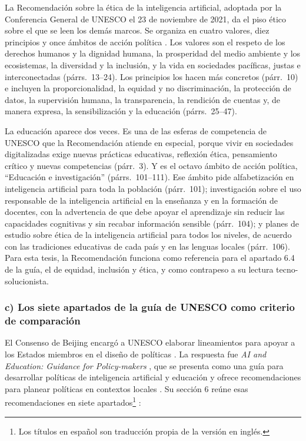 La Recomendación sobre la ética de la inteligencia artificial, adoptada por la Conferencia
General de UNESCO el 23 de noviembre de 2021, da el piso ético sobre el que se leen los
demás marcos. Se organiza en cuatro
valores, diez principios y once ámbitos de acción política \citep{unesco2021ai}. Los
valores son el respeto de los derechos humanos y la dignidad humana, la prosperidad del
medio ambiente y los ecosistemas, la diversidad y la inclusión, y la vida en sociedades
pacíficas, justas e interconectadas (párrs.~13--24). Los principios los hacen más
concretos (párr.~10) e incluyen la proporcionalidad, la equidad y no discriminación, la
protección de datos, la supervisión humana, la transparencia, la rendición de cuentas y,
de manera expresa, la sensibilización y la educación (párrs.~25--47).

La educación aparece dos veces. Es una de las esferas de competencia de UNESCO que la
Recomendación atiende en especial, porque vivir en sociedades digitalizadas exige nuevas
prácticas educativas, reflexión ética, pensamiento crítico y nuevas competencias
(párr.~3). Y es el octavo ámbito de acción política, ``Educación e investigación''
(párrs.~101--111). Ese ámbito pide alfabetización en inteligencia artificial para toda la
población (párr.~101); investigación sobre el uso responsable de la inteligencia artificial
en la enseñanza y en la formación de docentes, con la advertencia de que debe apoyar el
aprendizaje sin reducir las capacidades cognitivas y sin recabar información sensible
(párr.~104); y planes de estudio sobre ética de la inteligencia artificial para todos los
niveles, de acuerdo con las tradiciones educativas de cada país y en las lenguas locales
(párr.~106). Para esta tesis, la Recomendación funciona como referencia para el apartado 6.4
de la guía, el de equidad, inclusión y ética, y como contrapeso a su lectura
tecno-solucionista.

\subsubsection*{c) Los siete apartados de la guía de UNESCO como criterio de comparación}

El Consenso de Beijing encargó a UNESCO elaborar lineamientos para apoyar a los Estados
miembros en el diseño de políticas \citep[párr.~40]{unesco2019beijing}. La respuesta fue
\textit{AI and Education: Guidance for Policy-makers} \citep{miao2021guidance}, que se
presenta como una guía para desarrollar políticas de inteligencia artificial y educación y
ofrece recomendaciones para planear políticas en contextos locales
\citep[p.~1]{miao2021guidance}. Su sección 6 reúne esas recomendaciones en siete
apartados\footnote{Los títulos en español son traducción propia de la versión en inglés.}
\citep[pp.~31--37]{miao2021guidance}:

